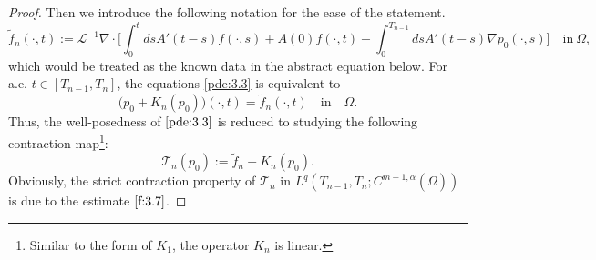 \documentclass[13pt,CJK]{article}
\theoremstyle{plain}                       %
\theoremstyle{remark}
\numberwithin{equation}{section}
\begin{document}
\begin{proof}
\medskip

Then we introduce the following notation for the ease of the statement.
\begin{equation*}
\tilde{f}_n(\cdot,t):=\mathcal{L}^{-1}\nabla\cdot\Big[
\int_{0}^tdsA'(t-s)f(\cdot,s)+A(0)f(\cdot,t)
-\int_{0}^{T_{n-1}}dsA'(t-s)\nabla p_0(\cdot,s)
\Big]\quad \text{in}~\Omega,
\end{equation*}
which would be treated as the known data in the abstract equation below. For a.e. $t\in[T_{n-1},T_n]$, the equations \eqref{pde:3.3} is equivalent to
\begin{equation}\label{pde:3.4}
\big(p_0+K_n(p_0)\big)(\cdot,t)=\tilde{f}_n(\cdot,t)
\quad \text{in}\quad\Omega.
\end{equation}
Thus, the well-posedness of $\eqref{pde:3.3}$ is reduced to studying  the following contraction map\footnote{Similar to the form of $K_1$,
the operator $K_n$ is linear.}:
\begin{equation}\label{f:3.8}
  \mathcal{T}_n(p_0) := \tilde{f}_n - K_n(p_0).
\end{equation}
Obviously, the strict contraction property of $\mathcal{T}_n$  in $L^q(T_{n-1},T_n;C^{m+1,\alpha}(\bar\Omega))$ is due to the estimate
$\eqref{f:3.7}$.

\medskip


\end{proof}
\end{document}
